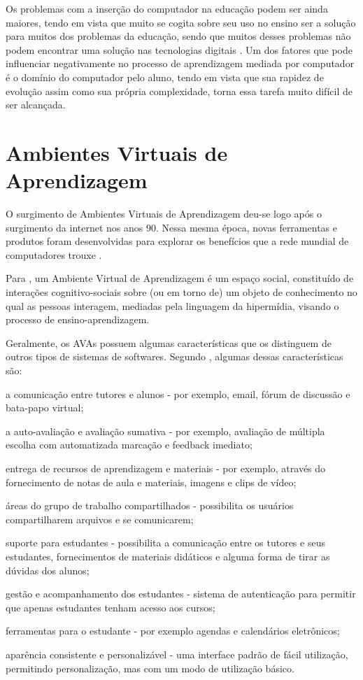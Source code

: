 Os problemas com a inserção do computador na educação podem ser ainda maiores, tendo em vista que muito se cogita sobre seu uso no ensino ser a solução para muitos dos problemas da educação, sendo que muitos desses problemas não podem encontrar uma solução nas tecnologias digitais \cite{silva2009ambiente}. Um dos fatores que pode influenciar negativamente no processo de aprendizagem mediada por computador é o domínio do computador pelo aluno, tendo em vista que sua rapidez de evolução assim como sua própria complexidade, torna essa tarefa muito difícil de ser alcançada.

\section{Ambientes Virtuais de Aprendizagem}

O surgimento de Ambientes Virtuais de Aprendizagem deu-se logo após o surgimento da internet nos anos 90. Nessa mesma época, novas ferramentas e produtos foram desenvolvidas para explorar os benefícios que a rede mundial de computadores trouxe \cite{oleary2002virtual}.

Para , um Ambiente Virtual de Aprendizagem é um espaço social, constituído de interações cognitivo-sociais sobre (ou em torno de) um objeto de conhecimento no qual as pessoas interagem, mediadas pela linguagem da hipermídia, visando o processo de ensino-aprendizagem.

Geralmente, os AVAs possuem algumas características que os distinguem de outros tipos de sistemas de softwares. Segundo , algumas dessas características são:
\begin{alineascomponto}
    \item a comunicação entre tutores e alunos - por exemplo, email, fórum de discussão e bata-papo virtual;
    \item a auto-avaliação e avaliação sumativa - por exemplo, avaliação de múltipla escolha com automatizada marcação e feedback imediato; 
    \item entrega de recursos de aprendizagem e materiais - por exemplo, através do fornecimento de notas de aula e materiais, imagens e clips de vídeo;
    \item áreas do grupo de trabalho compartilhados - possibilita os usuários compartilharem arquivos e se comunicarem;
    \item suporte para estudantes - possibilita a comunicação entre os tutores e seus estudantes, fornecimentos de materiais didáticos e alguma forma de tirar as dúvidas dos alunos;
    \item gestão e acompanhamento dos estudantes - sistema de autenticação para permitir que apenas estudantes tenham acesso aos cursos;
    \item ferramentas para o estudante - por exemplo agendas e calendários eletrônicos;
    \item aparência consistente e personalizável - uma interface padrão de fácil utilização, permitindo personalização, mas com um modo de utilização básico.
\end{alineascomponto}

